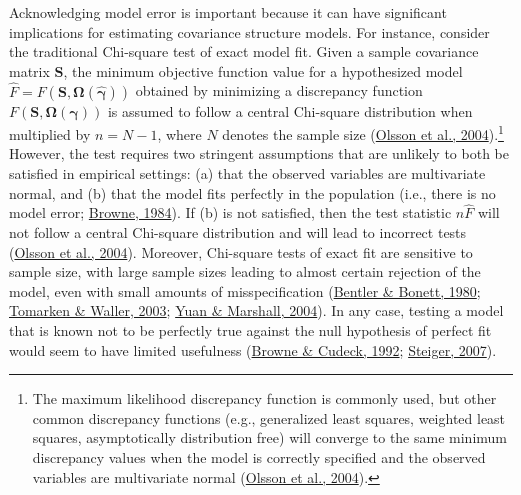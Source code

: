 \documentclass[11pt]{umnthesis}
\begin{document}
Acknowledging model error is important because it can have significant implications for estimating covariance structure models. For instance, consider the traditional Chi-square test of exact model fit. Given a sample covariance matrix \(\mathbf{S}\), the minimum objective function value for a hypothesized model \(\hat{F} = F(\mathbf{S}, \bm{\Omega}(\hat{\bm{\gamma}}))\) obtained by minimizing a discrepancy function \(F(\mathbf{S}, \bm{\Omega}(\bm{\gamma}))\) is assumed to follow a central Chi-square distribution when multiplied by \(n = N - 1\), where \(N\) denotes the sample size (\protect\hyperlink{ref-olsson2004}{Olsson et al., 2004}).\footnote{The maximum likelihood discrepancy function is commonly used, but other common discrepancy functions (e.g., generalized least squares, weighted least squares, asymptotically distribution free) will converge to the same minimum discrepancy values when the model is correctly specified and the observed variables are multivariate normal (\protect\hyperlink{ref-olsson2004}{Olsson et al., 2004}).} However, the test requires two stringent assumptions that are unlikely to both be satisfied in empirical settings: (a) that the observed variables are multivariate normal, and (b) that the model fits perfectly in the population (i.e., there is no model error; \protect\hyperlink{ref-browne1984}{Browne, 1984}). If (b) is not satisfied, then the test statistic \(n \hat{F}\) will not follow a central Chi-square distribution and will lead to incorrect tests (\protect\hyperlink{ref-olsson2004}{Olsson et al., 2004}). Moreover, Chi-square tests of exact fit are sensitive to sample size, with large sample sizes leading to almost certain rejection of the model, even with small amounts of misspecification (\protect\hyperlink{ref-bentler1980}{Bentler \& Bonett, 1980}; \protect\hyperlink{ref-tomarken2003}{Tomarken \& Waller, 2003}; \protect\hyperlink{ref-yuan2004}{Yuan \& Marshall, 2004}). In any case, testing a model that is known not to be perfectly true against the null hypothesis of perfect fit would seem to have limited usefulness (\protect\hyperlink{ref-browne1992}{Browne \& Cudeck, 1992}; \protect\hyperlink{ref-steiger2007}{Steiger, 2007}).
\end{document}
